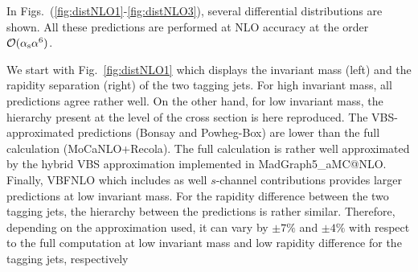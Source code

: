 In Figs.~(\ref{fig:distNLO1}-\ref{fig:distNLO3}), several differential distributions are shown.
All these predictions are performed at NLO accuracy at the order $\mathcal{O}(\alpha_\text{s}\alpha^6)$.

We start with Fig.~\ref{fig:distNLO1} which displays the invariant mass (left) and the rapidity separation (right) of the two tagging jets.
For high invariant mass, all predictions agree rather well.
On the other hand, for low invariant mass, the hierarchy present at the level of the cross section is here reproduced.
The VBS-approximated predictions ({\sc Bonsay} and {\sc Powheg-Box}) are lower than the full calculation ({\sc MoCaNLO}+{\sc Recola}).
The full calculation is rather well approximated by the hybrid VBS approximation implemented in {\sc MadGraph5\_aMC\-@NLO}.
Finally, {\sc VBFNLO} which includes as well $s$-channel contributions provides larger predictions at low invariant mass.
For the rapidity difference between the two tagging jets, the hierarchy between the predictions is rather similar.
Therefore, depending on the approximation used, it can vary by $\pm7\%$ and $\pm4\%$ with respect to the full computation at low invariant mass and low rapidity difference for the tagging jets, respectively

